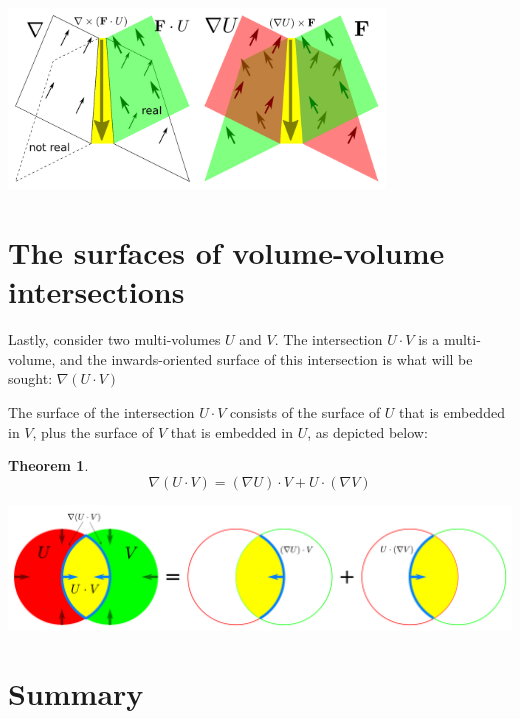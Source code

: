 \documentclass{book}
\newtheorem{thm}{Theorem}
\begin{document}
\begin{center}
\includegraphics[width = 0.75\textwidth]{Boundaries/Surface_boundaries/surface_volume_intersection_mnemonic}
\end{center}




\section{The surfaces of volume-volume intersections}

Lastly, consider two multi-volumes \(U\) and \(V\). The intersection \(U \cdot V\) is a multi-volume, and the inwards-oriented surface of this intersection is what will be sought: \(\nabla(U \cdot V)\)

The surface of the intersection \(U \cdot V\) consists of the surface of \(U\) that is embedded in \(V\), plus the surface of \(V\) that is embedded in \(U\), as depicted below: 

\begin{thm}
\[\nabla(U \cdot V) = (\nabla U) \cdot V + U \cdot (\nabla V)\]
\end{thm}

\begin{center}
\includegraphics[width = \textwidth]{Boundaries/Volume_inwards_oriented_surfaces/volume_volume_intersection_surface}
\end{center}



\section{Summary}
\end{document}
